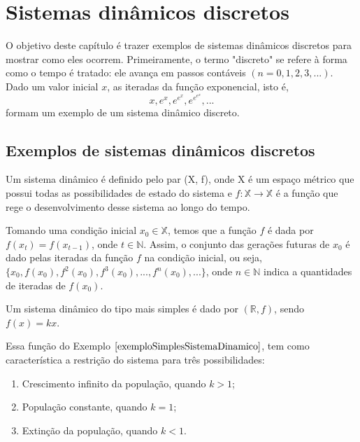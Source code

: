 \documentclass[../IC.tex]{subfiles}
\begin{document}
	\chapter{Sistemas dinâmicos discretos}
	
	O objetivo deste capítulo é trazer exemplos de sistemas dinâmicos discretos para mostrar como eles ocorrem. Primeiramente, o termo "discreto" se refere à forma como o tempo é tratado: ele avança em passos contáveis $(n=0,1,2,3,...)$. Dado um valor inicial $x$, as iteradas da função exponencial, isto é,
	$$x, e^x, e^{e^x}, e^{e^{e^{x}}}, ...$$
	formam um exemplo de um sistema dinâmico discreto.
	
	\section{Exemplos de sistemas dinâmicos discretos}
	
	\begin{definicao}
		Um sistema dinâmico é definido pelo par (X, f), onde X é um espaço métrico que possui todas as possibilidades de estado do sistema e $f: \mathbb{X} \rightarrow \mathbb{X}$ é a função que rege o desenvolvimento desse sistema ao longo do tempo.
	\end{definicao}
	
	Tomando uma condição inicial $x_0 \in \mathbb{X}$, temos que a função $f$ é dada por $f(x_t) = f(x_{t-1})$, onde $t \in \mathbb{N}$. Assim, o conjunto das gerações futuras de $x_0$ é dado pelas iteradas da função $f$ na condição inicial, ou seja, $\{x_0, f(x_0), f^2(x_0), f^3(x_0), ..., f^n(x_0), ...\}$, onde $n \in \mathbb{N}$ indica a quantidades de iteradas de $f(x_0)$.
	
	\begin{exemplo}\label{exemploSimplesSistemaDinamico}
		Um sistema dinâmico do tipo mais simples é dado por $(\mathbb{R}, f)$, sendo $f(x) = kx$.
	\end{exemplo}
	
	Essa função do Exemplo $\ref{exemploSimplesSistemaDinamico}$, tem como característica a restrição do sistema para três possibilidades:
	\begin{enumerate}
		\item Crescimento infinito da população, quando $k > 1$; \vspace{-2mm}
		\item População constante, quando $k = 1$; \vspace{-2mm}
		\item Extinção da população, quando $k < 1$. \vspace{-2mm}
	\end{enumerate}
	
\end{document}
